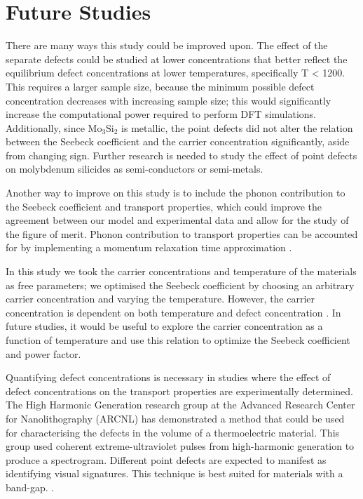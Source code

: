 \documentclass[7.5pt]{article}
\theoremstyle{plain}
\theoremstyle{definition}
\newcommand{\<}{\langle}
\renewcommand{\>}{\rangle}
\begin{document}
\smallskip

\section{Future Studies}

\begin{multicols}{2}

\noindent There are many ways this study could be improved upon. 
The effect of the separate defects could be studied at lower concentrations that better reflect the equilibrium defect concentrations at lower temperatures, specifically T < 1200.
This requires a larger sample size, because the minimum possible defect concentration decreases with increasing sample size; this would significantly increase the computational power required to perform DFT simulations. 
Additionally, since $\text{Mo}_{3}\text{Si}_{2}$ is metallic, the point defects did not alter the relation between the Seebeck coefficient and the carrier concentration significantly, aside from changing sign. 
Further research is needed to study the effect of point defects on molybdenum silicides as semi-conductors or semi-metals. 

Another way to improve on this study is to include the phonon contribution to the Seebeck coefficient and transport properties, which could improve the agreement between our model and experimental data and allow for the study of the figure of merit. 
Phonon contribution to transport properties can be accounted for by implementing a momentum relaxation time approximation \cite{Ganose2021}.

In this study we took the carrier concentrations and temperature of the materials as free parameters; we optimised the Seebeck coefficient by choosing an arbitrary carrier concentration and varying the temperature. 
However, the carrier concentration is dependent on both temperature and defect concentration \cite{carriertemp}. 
In future studies, it would be useful to explore the carrier concentration as a function of temperature and use this relation to optimize the Seebeck coefficient and power factor.

Quantifying defect concentrations is necessary in studies where the effect of defect concentrations on the transport properties are experimentally determined.
The High Harmonic Generation research group at the Advanced Research Center for Nanolithography (ARCNL) has demonstrated a method that could be used for characterising the defects in the volume of a thermoelectric material. 
This group used coherent extreme-ultraviolet pulses from high-harmonic generation to produce a spectrogram. Different point defects are expected to manifest as identifying visual signatures. 
This technique is best suited for materials with a band-gap.  \cite{RoscamAbbingSylvianneD.C2022ESaI}. 


\end{multicols}
\end{document}
